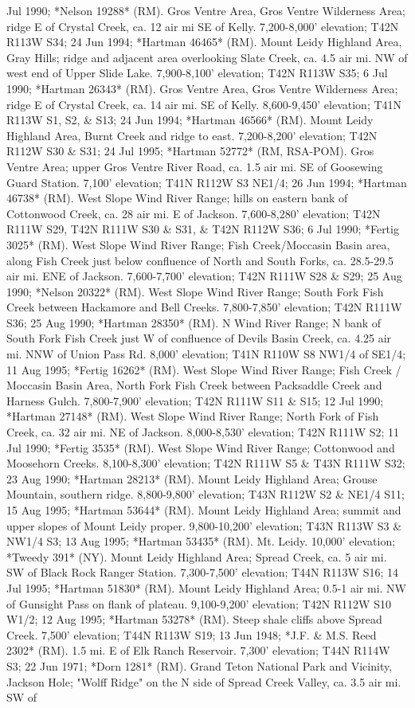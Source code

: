 Jul 1990; *Nelson 19288* (RM).  Gros Ventre Area, Gros Ventre Wilderness Area; ridge E of Crystal Creek, ca. 12 air mi SE of Kelly.  7,200-8,000' elevation; T42N R113W S34; 24 Jun 1994; *Hartman 46465* (RM).  Mount Leidy Highland Area, Gray Hills; ridge and adjacent area overlooking Slate Creek, ca. 4.5 air mi. NW of west end of Upper Slide Lake. 7,900-8,100' elevation; T42N R113W S35; 6 Jul 1990; *Hartman 26343* (RM).  Gros Ventre Area, Gros Ventre Wilderness Area; ridge E of Crystal Creek, ca. 14 air mi. SE of Kelly. 8,600-9,450' elevation; T41N R113W S1, S2, \& S13; 24 Jun 1994; *Hartman 46566* (RM).  Mount Leidy Highland Area, Burnt Creek and ridge to east. 7,200-8,200' elevation; T42N R112W S30 \& S31; 24 Jul 1995; *Hartman 52772* (RM, RSA-POM).  Gros Ventre Area; upper Gros Ventre River Road, ca. 1.5 air mi. SE of Goosewing Guard Station. 7,100' elevation; T41N R112W S3 NE1/4; 26 Jun 1994; *Hartman 46738* (RM).  West Slope Wind River Range; hills on eastern bank of Cottonwood Creek, ca. 28 air mi. E of Jackson. 7,600-8,280' elevation; T42N R111W S29, T42N R111W S30 \& S31, \& T42N R112W S36; 6 Jul 1990; *Fertig 3025* (RM).  West Slope Wind River Range; Fish Creek/Moccasin Basin area, along Fish Creek just below confluence of North and South Forks, ca. 28.5-29.5 air mi. ENE of Jackson. 7,600-7,700' elevation; T42N R111W S28 \& S29; 25 Aug 1990; *Nelson 20322* (RM).  West Slope Wind River Range; South Fork Fish Creek between Hackamore and Bell Creeks. 7,800-7,850' elevation; T42N R111W S36; 25 Aug 1990; *Hartman 28350* (RM).  N Wind River Range; N bank of South Fork Fish Creek just W of confluence of Devils Basin Creek, ca. 4.25 air mi. NNW of Union Pass Rd. 8,000' elevation; T41N R110W S8 NW1/4 of SE1/4; 11 Aug 1995; *Fertig 16262* (RM).  West Slope Wind River Range; Fish Creek / Moccasin Basin Area, North Fork Fish Creek between Packsaddle Creek and Harness Gulch. 7,800-7,900' elevation; T42N R111W S11 \& S15; 12 Jul 1990; *Hartman 27148* (RM).  West Slope Wind River Range; North Fork of Fish Creek, ca. 32 air mi. NE of Jackson. 8,000-8,530' elevation; T42N R111W S2; 11 Jul 1990; *Fertig 3535* (RM).  West Slope Wind River Range; Cottonwood and Moosehorn Creeks. 8,100-8,300' elevation; T42N R111W S5 \& T43N R111W S32; 23 Aug 1990; *Hartman 28213* (RM).  Mount Leidy Highland Area; Grouse Mountain, southern ridge. 8,800-9,800' elevation; T43N R112W S2 \& NE1/4 S11; 15 Aug 1995; *Hartman 53644* (RM).  Mount Leidy Highland Area; summit and upper slopes of Mount Leidy proper. 9,800-10,200' elevation; T43N R113W S3 \& NW1/4 S3; 13 Aug 1995; *Hartman 53435* (RM).  Mt. Leidy. 10,000' elevation; *Tweedy 391* (NY).  Mount Leidy Highland Area; Spread Creek, ca. 5 air mi. SW of Black Rock Ranger Station. 7,300-7,500' elevation; T44N R113W S16; 14 Jul 1995; *Hartman 51830* (RM).  Mount Leidy Highland Area; 0.5-1 air mi. NW of Gunsight Pass on flank of plateau. 9,100-9,200' elevation; T42N R112W S10 W1/2; 12 Aug 1995; *Hartman 53278* (RM).  Steep shale cliffs above Spread Creek. 7,500' elevation; T44N R113W S19; 13 Jun 1948; *J.F. \& M.S. Reed 2302* (RM).  1.5 mi. E of Elk Ranch Reservoir. 7,300' elevation; T44N R114W S3; 22 Jun 1971; *Dorn 1281* (RM).  Grand Teton National Park and Vicinity, Jackson Hole; "Wolff Ridge" on the N side of Spread Creek Valley, ca. 3.5 air mi. SW of 
